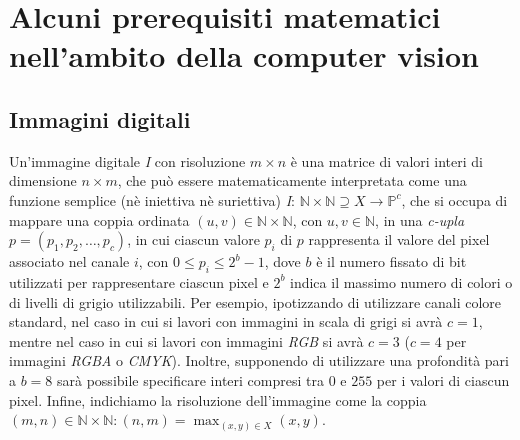 \chapter{Alcuni prerequisiti matematici nell'ambito della computer vision}
\label{chap:math-prerequisites}


\section{Immagini digitali}
Un'immagine digitale \textit{I} con risoluzione $m\times n$ \`e una matrice di valori interi di dimensione $n\times m$, che pu\`o essere matematicamente interpretata come una funzione semplice (n\`e iniettiva n\`e suriettiva) \textit{I}: $\mathbb{N}\times\mathbb{N}\supseteq X \to \mathbb{P}^{c}$, che si occupa di mappare una coppia ordinata $(u,v)\in\mathbb{N}\times\mathbb{N}$, con $u,v\in\mathbb{N}$, in una \textit{c-upla} $p=(p_{1}, p_{2}, \dots, p_{c})$, in cui ciascun valore $p_{i}$ di $p$ rappresenta il valore del pixel associato nel canale ${i}$, con $0 \leq p_{i} \leq 2^{b} - 1$, dove $b$ \`e il numero fissato di bit utilizzati per rappresentare ciascun pixel e $2^{b}$ indica il massimo numero di colori o di livelli di grigio utilizzabili. Per esempio, ipotizzando di utilizzare canali colore standard, nel caso in cui si lavori con immagini in scala di grigi si avr\`a $c=1$, mentre nel caso in cui si lavori con immagini \textit{RGB} si avr\`a $c=3$ ($c=4$ per immagini \textit{RGBA} o \textit{CMYK}). Inoltre, supponendo di utilizzare una profondit\`a pari a $b=8$ sar\`a possibile specificare interi compresi tra $0$ e $255$ per i valori di ciascun pixel. Infine, indichiamo la risoluzione dell'immagine come la coppia $(m, n)\in\mathbb{N}\times\mathbb{N}\colon(n, m)=\max_{(x, y)\in X} (x,y)$.


